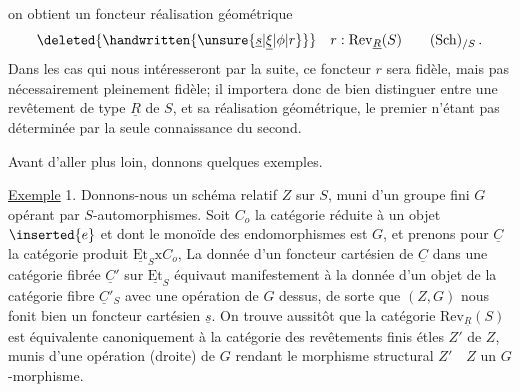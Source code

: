  on obtient un foncteur réalisation géométrique
\[
\deleted{\handwritten{\unsure{\underline{s}|\underline{\xi}|\phi|r}}}\quad r:\mathrm{Rev}_{\underline{R}}(S)\qquad(\mathrm{Sch})_{/S}\,.
\]
Dans les cas qui nous intéresseront par la suite, ce foncteur $r$ sera fidèle, mais pas nécessairement pleinement fidèle; il importera donc de bien distinguer entre une revêtement de type $\underline{R}$ de $S$, et sa réalisation géométrique, le premier n'étant pas déterminée par la seule connaissance du second.

Avant d'aller plus loin, donnons quelques exemples.

\uline{Exemple} 1. Donnons-nous un schéma relatif $Z$ sur $S$, muni d'un groupe fini $G$ opérant  par $S$-automorphismes. Soit $C_o$ la catégorie réduite à un objet $\inserted{e}$ et dont le monoïde des endomorphismes est $G$, et prenons pour $\underline{C}$ la catégorie produit $\underline{\mathrm{Et}}_S\mathrm{x}C_o$,  La donnée d'un foncteur cartésien de  $\underline{C}$ dans une catégorie fibrée $\underline{C}'$ sur $\underline{\mathrm{Et}}_S$ équivaut manifestement à la donnée d'un objet de la catégorie fibre $\underline{C}'_S$ avec une opération de $G$ dessus, de sorte que $(Z,G)$ nous fonit bien un foncteur cartésien $\underline{s}$. On trouve aussitôt que la catégorie $\mathrm{Rev}_{\underline{R}}(S)$ est équivalente canoniquement à la  catégorie des revêtements finis étles $Z'$ de $Z$, munis d'une opération (droite) de $G$  rendant le morphisme structural $Z'\quad Z$ un $G$-morphisme.

